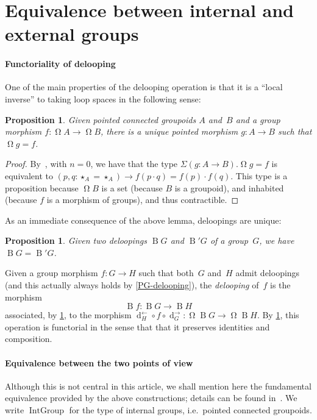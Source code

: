 \documentclass[10pt,a4paper]{amsart}
\newtheorem{proposition}[theorem]{Proposition}
\theoremstyle{definition}
\newcommand{\B}{\operatorname{B}} %
\newcommand{\pt}[1]{\star_{#1}} %
\newcommand{\pcomp}{\cdot} %
\newcommand{\transport}[1]{#1^\to} %
\newcommand{\transportinv}[1]{#1^\ot} %
\newcommand{\Beq}[1]{\operatorname{d}_{#1}} %
\newcommand{\Loop}{\operatorname{\Omega}} %
\newcommand{\IGroup}[1][1]{\operatorname{IntGroup}} %
\newcommand{\ot}{\leftarrow}
\newcommand{\ie}{i.e.~}
\begin{document}
\section{Equivalence between internal and external groups}
\paragraph{Functoriality of delooping}
\label{delooping-functorial}
One of the main properties of the delooping operation is that it is a ``local
inverse'' to taking loop spaces in the following sense:

\begin{proposition}
  \label{delooping-morphisms}
  Given pointed connected groupoids $A$ and~$B$ and a group morphism
  $f:\Loop A\to\Loop B$, there is a unique pointed morphism $g:A\to B$ such
  that $\Loop g=f$.
\end{proposition}
\begin{proof}
  By~\cite[Corollary~12]{warn2023eilenberg}, with $n=0$, we have that the type
  $\Sigma(g:A\to B).\Loop g=f$ is equivalent to
  $(p,q:\pt{A}=\pt{A})\to f(p\pcomp q)=f(p)\pcomp f(q)$. This type is a
  proposition because $\Loop B$ is a set (because $B$ is a groupoid), and
  inhabited (because $f$ is a morphism of groups), and thus contractible.
\end{proof}

\noindent
As an immediate consequence of the above lemma, deloopings are unique:

\begin{proposition}
  \label{delooping-unique}
  Given two deloopings $\B G$ and $\B' G$ of a group~$G$, we have $\B G=\B' G$.
\end{proposition}

\noindent
Given a group morphism $f:G\to H$ such that both~$G$ and~$H$ admit deloopings
(and this actually always holds by \cref{PG-delooping}), the \emph{delooping} of~$f$ is the morphism
\[
  \B f:\B G\to\B H
\]
associated, by \cref{delooping-morphisms}, to the morphism
$\transportinv{\Beq H}\circ f\circ\transport{\Beq G}:\Loop\B G\to\Loop\B
H$. By \cref{delooping-morphisms}, this operation is functorial in the sense
that that it preserves identities and composition.

\paragraph{Equivalence between the two points of view}
Although this is not central in this article, we shall mention here the
fundamental equivalence provided by the above constructions; details can be
found in~\cite{symmetry}.
%
We write $\IGroup$ for the type of internal groups, \ie pointed connected
groupoids.
\end{document}

